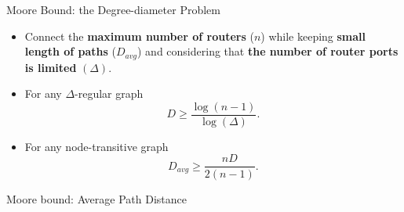 \begin{frame}[t]{Moore Bound: the Degree-diameter Problem}
\begin{itemize}
\item Connect the \textbf{maximum number of routers} ($n$) while keeping \textbf{small length of paths} ($D_{avg}$) and considering that \textbf{the number of router ports is limited} $(\Delta)$.
\item For any $\Delta$-regular graph
$$\displaystyle D\geq \frac{\log(n-1)}{\log(\Delta)}.$$
\item For any node-transitive graph 
$$\displaystyle D_{avg}\geq \frac{nD}{2(n-1)}.$$
\end{itemize}
\end{frame}
%

\begin{frame}[t]{Moore bound: Average Path Distance}
\end{frame}